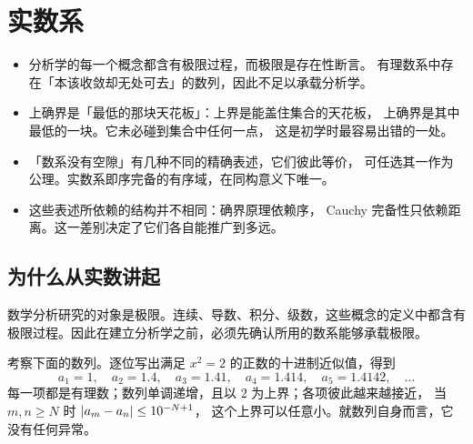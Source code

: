 \chapter{实数系}
\label{ch:reals}

\begin{keypoint}[本章要点]
  \begin{itemize}
    \item 分析学的每一个概念都含有极限过程，而极限是存在性断言。
          有理数系中存在「本该收敛却无处可去」的数列，因此不足以承载分析学。
    \item 上确界是「最低的那块天花板」：上界是能盖住集合的天花板，
          上确界是其中最低的一块。它未必碰到集合中任何一点，
          这是初学时最容易出错的一处。
    \item 「数系没有空隙」有几种不同的精确表述，它们彼此等价，
          可任选其一作为公理。实数系即序完备的有序域，在同构意义下唯一。
    \item 这些表述所依赖的结构并不相同：确界原理依赖序，
          Cauchy 完备性只依赖距离。这一差别决定了它们各自能推广到多远。
  \end{itemize}
\end{keypoint}

\section{为什么从实数讲起}
\label{sec:why-reals}

数学分析研究的对象是极限。连续、导数、积分、级数，这些概念的定义中都含有极限过程。因此在建立分析学之前，必须先确认所用的数系能够承载极限。

考察下面的数列。逐位写出满足 \(x^{2} = 2\) 的正数的十进制近似值，得到
\begin{equation}
  \label{eq:sqrt2-decimal}
  a_{1} = 1, \quad a_{2} = 1.4, \quad a_{3} = 1.41, \quad
  a_{4} = 1.414, \quad a_{5} = 1.4142, \quad \dots
\end{equation}
每一项都是有理数；数列单调递增，且以 \(2\) 为上界；各项彼此越来越接近，
当 \(m, n \ge N\) 时 \(\lvert a_{m} - a_{n}\rvert \le 10^{-N+1}\)，
这个上界可以任意小。就数列自身而言，它没有任何异常。

